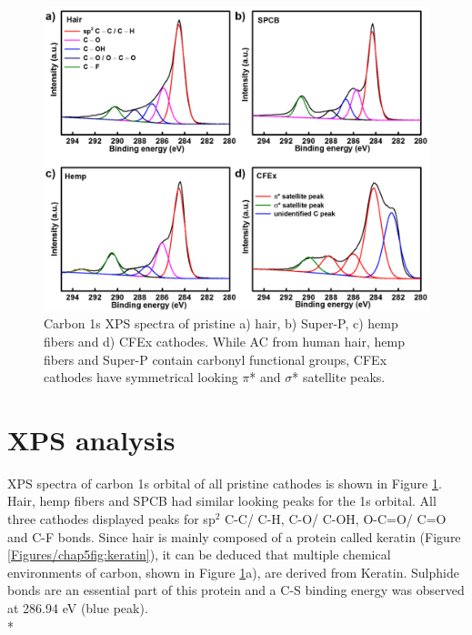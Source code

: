 \begin{figure}[h!]
  \centering
  \includegraphics[width=\textwidth]{Figures/chap5fig/XPSC}
    \caption{Carbon 1s XPS spectra of pristine a) hair, b) Super-P, c) hemp fibers and d) CFEx cathodes. While AC from human hair, hemp fibers and Super-P contain carbonyl functional groups, CFEx cathodes have symmetrical looking $\pi$* and $\sigma$* satellite peaks.}
  \label{Figures/chap5fig:XPSC}
\end{figure}
\section*{XPS analysis}
XPS spectra of carbon 1s orbital of all pristine cathodes is shown in Figure \ref{Figures/chap5fig:XPSC}. Hair, hemp fibers and SPCB had similar looking peaks for the 1s orbital. All three cathodes displayed peaks for sp$^2$ C-C/ C-H, C-O/ C-OH, O-C=O/ C=O and C-F bonds. Since hair is mainly composed of a protein called keratin (Figure \ref{Figures/chap5fig:keratin}), it can be deduced that multiple chemical environments of carbon, shown in Figure \ref{Figures/chap5fig:XPSC}a), are derived from Keratin. Sulphide bonds are an essential part of this protein and a C-S binding energy was observed at 286.94 eV (blue peak).\\*


